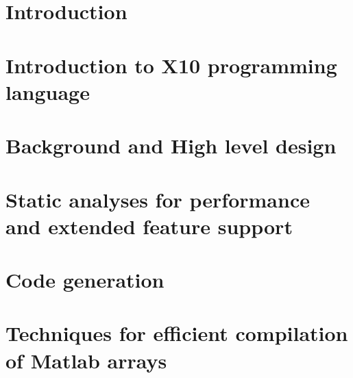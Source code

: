 \documentclass[MSc,twoside,openright]{Thesis}
\newcommand{\matlab}{{\sc Matlab}\xspace}
\newcommand{\xten}{{\sc X10}\xspace}
\begin{document}
\chapter{Introduction} \label{chap:Introduction}


\chapter{Introduction to \xten programming language} \label{chap:Xten}


%

\chapter{Background and High level design} \label{chap:Design}


\chapter{Static analyses for performance and extended feature support} 
\label{chap:Analyses}


\chapter{Code generation} \label{chap:Codegen}


\chapter{Techniques for efficient compilation of \matlab arrays} 
\label{chap:Arrays}


%
\end{document}
